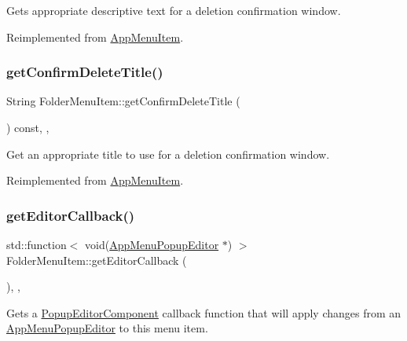 Gets appropriate descriptive text for a deletion confirmation window. 

Reimplemented from \mbox{\hyperlink{classAppMenuItem_ac5922f3ac33054ecd54bb3fab692d639}{App\+Menu\+Item}}.

\mbox{\label{classFolderMenuItem_ab3a7232acdc84681c8c31113383471ad}} 
\subsubsection{\texorpdfstring{get\+Confirm\+Delete\+Title()}{getConfirmDeleteTitle()}}
{\footnotesize\ttfamily String Folder\+Menu\+Item\+::get\+Confirm\+Delete\+Title (\begin{DoxyParamCaption}{ }\end{DoxyParamCaption}) const\hspace{0.3cm}{\ttfamily [override]}, {\ttfamily [protected]}, {\ttfamily [virtual]}}

Get an appropriate title to use for a deletion confirmation window. 

Reimplemented from \mbox{\hyperlink{classAppMenuItem_a93bd0cf3b4e28d09a4975023b383c1dc}{App\+Menu\+Item}}.

\mbox{\label{classFolderMenuItem_a165416374f830311c0881b568922f9f5}} 
\subsubsection{\texorpdfstring{get\+Editor\+Callback()}{getEditorCallback()}}
{\footnotesize\ttfamily std\+::function$<$ void(\mbox{\hyperlink{classAppMenuPopupEditor}{App\+Menu\+Popup\+Editor}} $\ast$) $>$ Folder\+Menu\+Item\+::get\+Editor\+Callback (\begin{DoxyParamCaption}{ }\end{DoxyParamCaption})\hspace{0.3cm}{\ttfamily [override]}, {\ttfamily [protected]}, {\ttfamily [virtual]}}

Gets a \mbox{\hyperlink{classPopupEditorComponent}{Popup\+Editor\+Component}} callback function that will apply changes from an \mbox{\hyperlink{classAppMenuPopupEditor}{App\+Menu\+Popup\+Editor}} to this menu item. 

